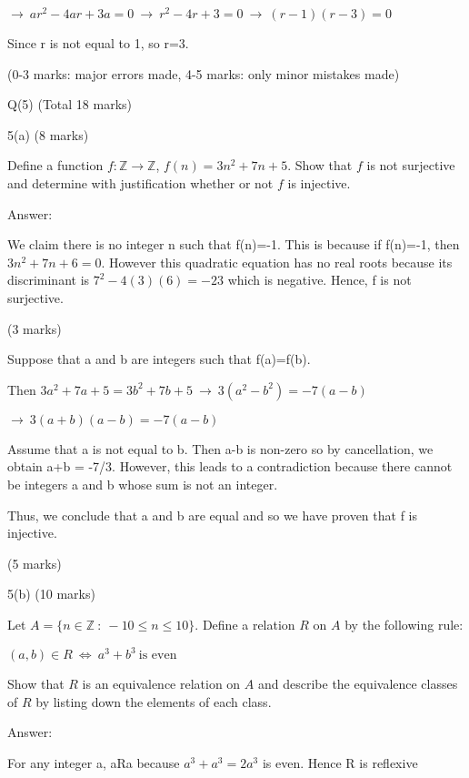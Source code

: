 \documentclass[a4paper,12pt,oneside]{book}
\theoremstyle{definition}
\begin{document}
$\longrightarrow \  ar^2 - 4ar + 3a = 0 \ \longrightarrow \ r^2 - 4r + 3 = 0 \ \longrightarrow  \ (r-1)(r-3)=0$

Since r is not equal to 1, so r=3.
 
(0-3 marks: major errors made, 4-5 marks: only minor mistakes made)







\newpage

Q(5) (Total 18 marks)

5(a) (8 marks)

Define a function $f : \mathbb{Z} \rightarrow \mathbb{Z}$, $f(n) = 3n^2 + 7n + 5$. Show that $f$ is not surjective and determine with justification whether or not $f$ is injective.

Answer:

We claim there is no integer n such that f(n)=-1. This is because if f(n)=-1, then $3n^2 + 7n + 6=0$. However this quadratic equation has no real roots because its discriminant is $7^2 - 4(3)(6) = -23$ which is negative. Hence, f is not surjective.

(3 marks)

Suppose that a and b are integers such that f(a)=f(b).

Then $3a^2 + 7a + 5 = 3b^2 + 7b + 5 \ \longrightarrow  \ 3(a^2-b^2) = -7(a-b)$

$\longrightarrow \ 3(a+b)(a-b) = -7(a-b)$

Assume that a is not equal to b. Then a-b is non-zero so by cancellation, we obtain a+b = -7/3. However, this leads to a contradiction because there cannot be integers a and b whose sum is not an integer. 

Thus, we conclude that a and b are equal and so we have proven that f is injective. 

(5 marks)

5(b) (10 marks)

Let $A = \{ n \in \mathbb{Z} \ : \ -10 \leq n \leq 10 \}$. Define a relation $R$ on $A$ by the following rule:

$(a,b) \in R \ \Leftrightarrow \ a^3+b^3 \ \text{is even}$

Show that $R$ is an equivalence relation on $A$ and describe the equivalence classes of $R$ by listing down the elements of each class.

Answer:

For any integer a, aRa because $a^3+a^3 = 2a^3$ is even. Hence R is reflexive
\end{document}
